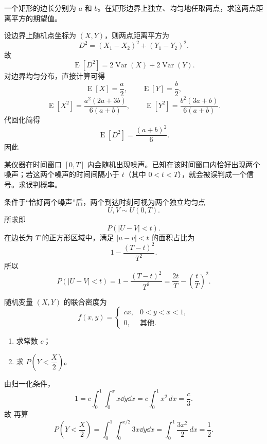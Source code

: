 \begin{question}
一个矩形的边长分别为 $a$ 和 $b$。在矩形边界上独立、均匀地任取两点，求这两点距离平方的期望值。
\begin{solution}
设边界上随机点坐标为 $(X,Y)$，则两点距离平方为
\[
D^2=(X_1-X_2)^2+(Y_1-Y_2)^2.
\]
故
\[
\operatorname{E}[D^2]=2\operatorname{Var}(X)+2\operatorname{Var}(Y).
\]
对边界均匀分布，直接计算可得
\[
\operatorname{E}[X]=\frac a2,\qquad \operatorname{E}[Y]=\frac b2,
\]
\[
\operatorname{E}[X^2]=\frac{a^2(2a+3b)}{6(a+b)},\qquad
\operatorname{E}[Y^2]=\frac{b^2(3a+b)}{6(a+b)}.
\]
代回化简得
\[
\operatorname{E}[D^2]=\frac{(a+b)^2}{6}.
\]
因此
\end{solution}
\end{question}

\begin{question}
某仪器在时间窗口 $[0,T]$ 内会随机出现噪声。已知在该时间窗口内恰好出现两个噪声；若这两个噪声的时间间隔小于 $t$（其中 $0<t<T$），就会被误判成一个信号。求误判概率。
\begin{solution}
条件于“恰好两个噪声”后，两个到达时刻可视为两个独立均匀点
\[
U,V\sim U(0,T).
\]
所求即
\[
P(|U-V|<t).
\]
在边长为 $T$ 的正方形区域中，满足 $|u-v|<t$ 的面积占比为
\[
1-\frac{(T-t)^2}{T^2}.
\]
所以
\[
P(|U-V|<t)=1-\frac{(T-t)^2}{T^2}
=\frac{2t}{T}-\left(\frac{t}{T}\right)^2.
\]
\end{solution}
\end{question}

\begin{question}
随机变量 $(X,Y)$ 的联合密度为
\[
f(x,y)=\begin{cases}
cx,&0<y<x<1,\\
0,&\text{其他}.
\end{cases}
\]
\begin{enumerate}[label=(\alph*),leftmargin=2.8em,itemsep=0.2em]
\item 求常数 $c$；
\item 求 $P\!\left(Y<\dfrac{X}{2}\right)$。
\end{enumerate}
\begin{solution}
由归一化条件，
\[
1=c\int_0^1\int_0^x x\dd{y}\dd{x}
=c\int_0^1 x^2\,dx
=\frac{c}{3}.
\]
故
再算
\[
P\!\left(Y<\frac X2\right)=\int_0^1\int_0^{x/2}3x\dd{y}\dd{x}
=\int_0^1 \frac{3x^2}{2}\,dx
=\frac12.
\]
\end{solution}
\end{question}

